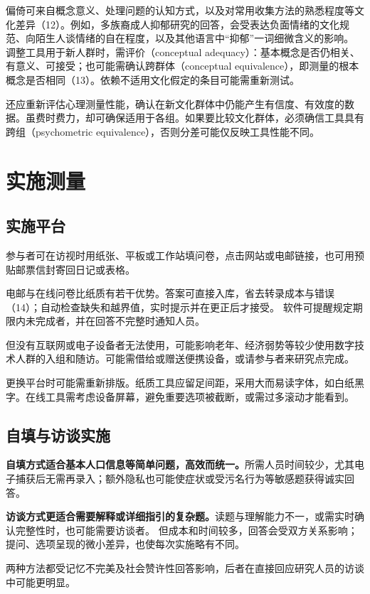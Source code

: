 偏倚可来自概念意义、处理问题的认知方式，以及对常用收集方法的熟悉程度等文化差异（12）。例如，多族裔成人抑郁研究的回答，会受表达负面情绪的文化规范、向陌生人谈情绪的自在程度，以及其他语言中“抑郁”一词细微含义的影响。
调整工具用于新人群时，需评价（conceptual adequacy）：基本概念是否仍相关、有意义、可接受；也可能需确认跨群体（conceptual equivalence），即测量的根本概念是否相同（13）。依赖不适用文化假定的条目可能需重新测试。

还应重新评估心理测量性能，确认在新文化群体中仍能产生有信度、有效度的数据。虽费时费力，却可确保适用于各组。如果要比较文化群体，必须确信工具具有跨组（psychometric equivalence），否则分差可能仅反映工具性能不同。

\section{实施测量}
\subsection{实施平台}
参与者可在访视时用纸张、平板或工作站填问卷，点击网站或电邮链接，也可用预贴邮票信封寄回日记或表格。

电邮与在线问卷比纸质有若干优势。答案可直接入库，省去转录成本与错误（14）；自动检查缺失和越界值，实时提示并在更正后才接受。
软件可提醒规定期限内未完成者，并在回答不完整时通知人员。

但没有互联网或电子设备者无法使用，可能影响老年、经济弱势等较少使用数字技术人群的入组和随访。可能需借给或赠送便携设备，或请参与者来研究点完成。

更换平台时可能需重新排版。纸质工具应留足间距，采用大而易读字体，如白纸黑字。在线工具需考虑设备屏幕，避免重要选项被截断，或需过多滚动才能看到。

\subsection{自填与访谈实施}
\textbf{自填方式适合基本人口信息等简单问题，高效而统一。}所需人员时间较少，尤其电子捕获后无需再录入；额外隐私也可能使症状或受污名行为等敏感题获得诚实回答。

\textbf{访谈方式更适合需要解释或详细指引的复杂题。}读题与理解能力不一，或需实时确认完整性时，也可能需要访谈者。
但成本和时间较多，回答会受双方关系影响；提问、选项呈现的微小差异，也使每次实施略有不同。

两种方法都受记忆不完美及社会赞许性回答影响，后者在直接回应研究人员的访谈中可能更明显。

